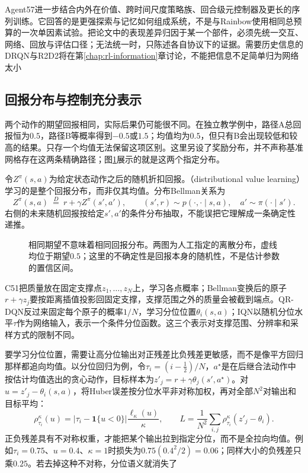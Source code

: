 Agent57进一步结合内外在价值、跨时间尺度策略族、回合级元控制器及更长的序列训练。它回答的是更强探索与记忆如何组成系统，不是与Rainbow使用相同总预算的一次单因素试验。把论文中的表现差异归因于某一个部件，必须先统一交互、网络、回放与评估口径；无法统一时，只陈述各自协议下的证据。需要历史信息的DRQN与R2D2将在第\ref{chap:rl-information}章讨论，不能把信息不足简单归为网络太小

\subsection{回报分布与控制充分表示}
\label{sec:rl-learning-distributional}

两个动作的期望回报相同，实际后果仍可能很不同。在独立教学例中，路径A总回报恒为$0.5$，路径B等概率得到$-0.5$或$1.5$；均值均为$0.5$，但只有B会出现较低和较高的结果。只存一个均值无法保留这项区别。这里另设了奖励分布，并不声称基准网格存在这两条精确路径；图\ref{fig:rl-learning-return-distributions}展示的就是这两个指定分布。

令$Z^\pi(s,a)$为给定状态动作之后的随机折扣回报。（distributional value learning）学习的是整个回报分布，而非仅其均值。分布Bellman关系为
\begin{equation}
  Z^\pi(s,a)\ \overset{D}{=}\ %
    r+\gamma Z^\pi(s',a'),\qquad
  (s',r)\sim p(\cdot,\cdot\mid s,a),\quad a'\sim\pi(\cdot\mid s').
  \label{eq:rl-learning-distributional-bellman}
\end{equation}
右侧的未来随机回报按给定$s',a'$的条件分布抽取，不能误把它理解成一条确定性递推。

\begin{figure}[htbp]
  \centering
  
  \caption{相同期望不意味着相同回报分布。两图为人工指定的离散分布，虚线均位于期望$0.5$；这里的不确定性是回报本身的随机性，不是估计参数的置信区间。}
  \label{fig:rl-learning-return-distributions}
\end{figure}

C51把质量放在固定支撑点$z_1,\ldots,z_N$上，学习各点概率；Bellman变换后的原子$r+\gamma z_j$要按距离插值投影回固定支撑，支撑范围之外的质量会被截到端点。QR-DQN反过来固定每个原子的概率$1/N$，学习分位位置$\theta_i(s,a)$；IQN以随机分位水平$\tau$作为网络输入，表示一个条件分位函数。这三个表示对支撑范围、分辨率和采样方式的限制不同。

要学习分位位置，需要让高分位输出对正残差比负残差更敏感，而不是像平方回归那样都追向均值。以分位回归为例，令$\tau_i=(i-\tfrac12)/N$，$a^\star$是在后继合法动作中按估计均值选出的贪心动作，目标样本为$z'_j=r+\gamma\theta_j(s',a^\star)$。对$u=z'_j-\theta_i(s,a)$，将Huber误差按分位水平非对称加权，再对全部$N^2$对输出和目标平均：
\[
  \rho_{\tau_i}^{\kappa}(u)
      =|\tau_i-\mathbf1\{u<0\}|\frac{\ell_\kappa(u)}{\kappa},
  \qquad
  L=\frac1{N^2}\sum_{i,j}\rho_{\tau_i}^{\kappa}(z'_j-\theta_i).
\]
正负残差具有不对称权重，才能把某个输出拉到指定分位，而不是全拉向均值。例如$\tau_i=0.75$、$u=0.4$、$\kappa=1$时损失为$0.75(0.4^2/2)=0.06$；同样大小的负残差只乘$0.25$。若去掉这种不对称，分位语义就消失了


